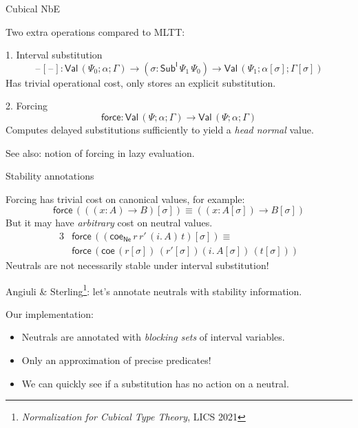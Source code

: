 \documentclass[dvipsnames]{beamer}
\newcommand{\ms}[1]{\mathsf{#1}}
\newcommand{\Sub}{\mathsf{Sub}}
\newcommand{\blank}{\mathord{\hspace{1pt}\text{--}\hspace{1pt}}}
\newcommand{\coe}{\mathsf{coe}}
\newcommand{\Val}{\ms{Val}}
\newcommand{\I}{\ms{I}}
\newcommand{\force}{\ms{force}}
\begin{document}
\begin{frame}{Cubical NbE}

Two extra operations compared to MLTT:

\begin{block}{1. Interval substitution}
  \[ \blank[\blank] : \Val\,(\Psi_0;\alpha;\Gamma) \to (\sigma : \Sub^\I\,\Psi_1\,\Psi_0)
  \to \Val\,(\Psi_1;\alpha[\sigma];\Gamma[\sigma]) \]
Has \alert{trivial operational cost}, only stores an explicit substitution.
\pause
\end{block}

\begin{block}{2. Forcing}
\[ \ms{force} : \Val\,(\Psi;\alpha;\Gamma) \to \Val\,(\Psi;\alpha;\Gamma) \]
Computes delayed substitutions sufficiently to yield a \emph{head normal} value.

See also: notion of forcing in lazy evaluation.
\end{block}

\end{frame}

\begin{frame}{Stability annotations}

Forcing has trivial cost on canonical values, for example:
  \[ \force\,(((x : A) \to B)[\sigma]) \equiv ((x : A[\sigma])\to B[\sigma]) \]
\pause
But it may have \emph{arbitrary} cost on neutral values.
\begin{alignat*}{3}
  & \force\,((\coe_{\ms{Ne}}\,r\,r'\,(i.\,A)\,t)[\sigma]) \equiv\\
  & \force\,(\coe\,(r[\sigma])\,(r'[\sigma]) (i.\,A[\sigma])\,(t[\sigma]))
\end{alignat*}
\pause
Neutrals are not necessarily stable under interval substitution!
\vspace{0.5em}
\pause

Angiuli \& Sterling\footnote<4->{\emph{Normalization for Cubical Type Theory}, LICS 2021}: let's annotate neutrals with stability information.
\vspace{0.5em}
\pause

Our implementation:
\begin{itemize}
  \item Neutrals are annotated with \emph{blocking sets} of interval variables.
  \item Only an approximation of precise predicates!
  \item We can quickly see if a substitution has no action on a neutral.
\end{itemize}

\end{frame}
\end{document}
